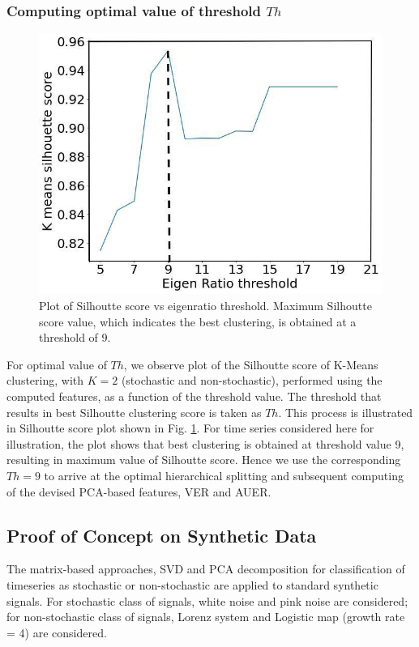 \documentclass[journal]{IEEEtran}
\begin{document}
	\subsubsection{ Computing optimal value of threshold $Th$} \label{compute_threshold}

		\begin{figure}[ht]
		\centering
		\includegraphics[width=0.7\linewidth]{threshold.jpg}
		\caption{Plot of Silhoutte score vs eigenratio threshold. Maximum Silhoutte score value, which indicates the best clustering, is obtained at a threshold of 9.}
		\label{sill}
	\end{figure}


	 For optimal value of $Th$, we observe plot of the Silhoutte score of K-Means clustering, with $K=2$ (stochastic and non-stochastic), performed using the computed features, as a function of the threshold value. The threshold that results in best Silhoutte clustering score is taken as $Th$. This process is illustrated in Silhoutte score plot shown in Fig. \ref{sill}. For time series considered here for illustration, the plot shows that best clustering is obtained at threshold value 9, resulting in maximum value of Silhoutte score. Hence we use the corresponding $Th = 9$ to arrive at the optimal hierarchical splitting and subsequent computing of the devised PCA-based features, VER and AUER.

	\subsection{Proof of Concept on Synthetic Data}
	The matrix-based approaches, SVD and PCA decomposition for classification of timeseries as stochastic or non-stochastic are applied to standard synthetic signals. For stochastic class of signals, white noise and pink noise are considered; for non-stochastic class of signals, Lorenz system and Logistic map (growth rate = 4) are considered.
	
\end{document}

